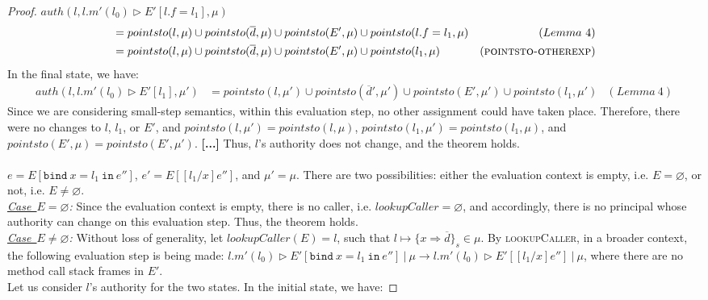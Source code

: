 \documentclass{llncs}
\newcommand{\keywadj}[1]{\mathtt{#1}}
\newcommand{\keyw}[1]{\keywadj{#1}~}
\newcommand{\todo}[1]{\textbf{[#1]}}
\begin{document}
\begin{proof}
\noindent$auth(l, l.m'(l_0) \rhd E'[l.f = l_1], \mu)$
\vspace{-7pt}
\begin{align*}
&= pointsto(l, \mu) \cup pointsto(\overline{d}, \mu) \cup pointsto(E', \mu) \cup pointsto(l.f = l_1, \mu) & (Lemma~4)\\
&= pointsto(l, \mu) \cup pointsto(\overline{d}, \mu) \cup pointsto(E', \mu) \cup pointsto(l_1, \mu) & (\textsc{pointsto-otherexp})
\end{align*}
In the final state, we have:
\begin{align*}
auth(l, l.m'(l_0) \rhd E'[l_1], \mu') &= pointsto(l, \mu') \cup pointsto(\overline{d}', \mu') \cup pointsto(E', \mu') \cup  pointsto(l_1, \mu') & (Lemma~4)
\end{align*}
Since we are considering small-step semantics, within this evaluation step, no other assignment could have taken place. Therefore, there were no changes to $l$, $l_1$, or $E'$, and $pointsto(l, \mu') = pointsto(l, \mu)$, $pointsto(l_1, \mu') = pointsto(l_1, \mu)$, and$pointsto(E', \mu) = pointsto(E', \mu')$. \todo{...} Thus, $l$'s authority does not change, and the theorem holds.\\\\


\noindent{}
$e = E[\keyw{bind} x = l_1~\keyw{in} e'']$, $e' = E[[l_1/x] e'']$, and $\mu' = \mu$. There are two possibilities: either the evaluation context is empty, i.e. $E = \varnothing$, or not, i.e. $E \not= \varnothing$.\\

\noindent\textit{\mbox{\underline{Case $E = \varnothing$}}:} Since the evaluation context is empty, there is no caller, i.e. $lookupCaller = \varnothing$, and accordingly, there is no principal whose authority can change on this evaluation step. Thus, the theorem holds.\\

\noindent\textit{\mbox{\underline{Case $E \not= \varnothing$}}:} Without loss of generality, let \mbox{$lookupCaller(E) = l$}, such that \mbox{$l \mapsto \{ x \Rightarrow \overline{d} \}_{s} \in \mu$}. By \textsc{lookupCaller}, in a broader context, the following evaluation step is being made: \mbox{$l.m'(l_0) \rhd E'[\keyw{bind} x = l_1~\keyw{in} e'']~|~\mu \longrightarrow l.m'(l_0) \rhd E'[[l_1/x] e'']~|~\mu$}, where there are no method call stack frames in $E'$.\\

\noindent Let us consider $l$'s authority for the two states. In the initial state, we have:


\end{proof}
\end{document}
